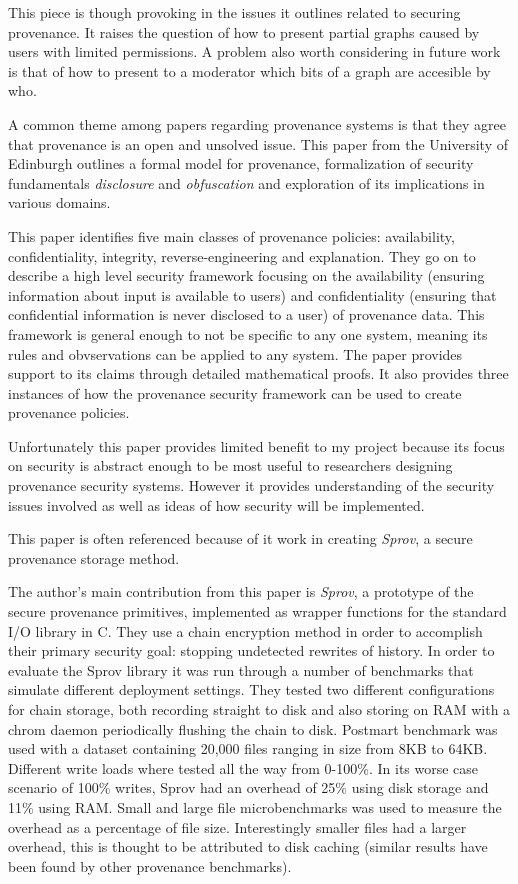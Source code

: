 This piece is though provoking in the issues it outlines related to securing provenance. It raises the question of how to present partial graphs caused by users with limited permissions. A problem also worth considering in future work is that of how to present to a moderator which bits of a graph are accesible by who.

A common theme among papers regarding provenance systems is that they agree that provenance is an open and unsolved issue. This paper from the University of Edinburgh outlines a formal model for provenance, formalization of security fundamentals \textit{disclosure} and \textit{obfuscation} and exploration of its implications in various domains.

This paper identifies five main classes of provenance policies: availability, confidentiality, integrity, reverse-engineering and explanation. They go on to describe a high level security framework focusing on the availability (ensuring information about input is available to users) and confidentiality (ensuring that confidential information is never disclosed to a user) of provenance data. This framework is general enough to not be specific to any one system, meaning its rules and obvservations can be applied to any system. The paper provides support to its claims through detailed mathematical proofs. It also provides three instances of how the provenance security framework can be used to create provenance policies.

Unfortunately this paper provides limited benefit to my project because its focus on security is abstract enough to be most useful to researchers designing provenance security systems. However it provides understanding of the security issues involved as well as ideas of how security will be implemented. 

This paper is often referenced because of it work in creating \textit{Sprov}, a secure provenance storage method. 

The author's main contribution from this paper is \textit{Sprov}, a prototype of the secure provenance primitives, implemented as wrapper functions for the standard I/O library in C. They use a chain encryption method in order to accomplish their primary security goal: stopping undetected rewrites of history. In order to evaluate the Sprov library it was run through a number of benchmarks that simulate different deployment settings. They tested two different configurations for chain storage, both recording straight to disk and also storing on RAM with a chrom daemon periodically flushing the chain to disk. Postmart benchmark was used with a dataset containing 20,000 files ranging in size from 8KB to 64KB. Different write loads where tested all the way from 0-100\%. In its worse case scenario of 100\% writes, Sprov had an overhead of 25\% using disk storage and 11\% using RAM. Small and large file microbenchmarks was used to measure the overhead as a percentage of file size. Interestingly smaller files had a larger overhead, this is thought to be attributed to disk caching (similar results have been found by other provenance benchmarks).

